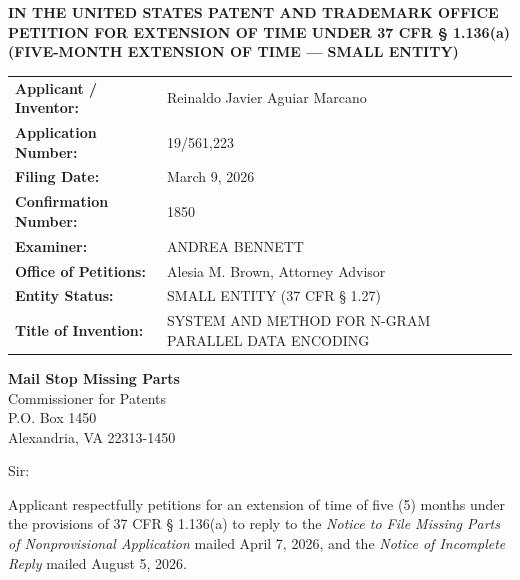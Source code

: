 \documentclass[11pt,letterpaper]{article}
\begin{document}
\thispagestyle{empty}

\begin{center}
    \textbf{\large IN THE UNITED STATES PATENT AND TRADEMARK OFFICE} \\
    \vspace{0.3cm}
    \textbf{\large PETITION FOR EXTENSION OF TIME UNDER 37 CFR \S{} 1.136(a)} \\
    \textbf{\normalsize (FIVE-MONTH EXTENSION OF TIME --- SMALL ENTITY)}
\end{center}

\vspace{0.4cm}
\noindent\begin{tabular}{p{2.3in}p{4.0in}}
\textbf{Applicant / Inventor:} & Reinaldo Javier Aguiar Marcano \\
\textbf{Application Number:} & 19/561,223 \\
\textbf{Filing Date:} & March 9, 2026 \\
\textbf{Confirmation Number:} & 1850 \\
\textbf{Examiner:} & ANDREA BENNETT \\
\textbf{Office of Petitions:} & Alesia M. Brown, Attorney Advisor \\
\textbf{Entity Status:} & SMALL ENTITY (37 CFR \S{} 1.27) \\
\textbf{Title of Invention:} & SYSTEM AND METHOD FOR N-GRAM PARALLEL DATA ENCODING \\
\end{tabular}

\vspace{0.5cm}
\noindent\textbf{Mail Stop Missing Parts} \\
Commissioner for Patents \\
P.O. Box 1450 \\
Alexandria, VA 22313-1450

\vspace{0.2cm}
Sir:

Applicant respectfully petitions for an extension of time of five (5) months under the provisions of 37 CFR \S{} 1.136(a) to reply to the \textit{Notice to File Missing Parts of Nonprovisional Application} mailed April 7, 2026, and the \textit{Notice of Incomplete Reply} mailed August 5, 2026.
\end{document}
